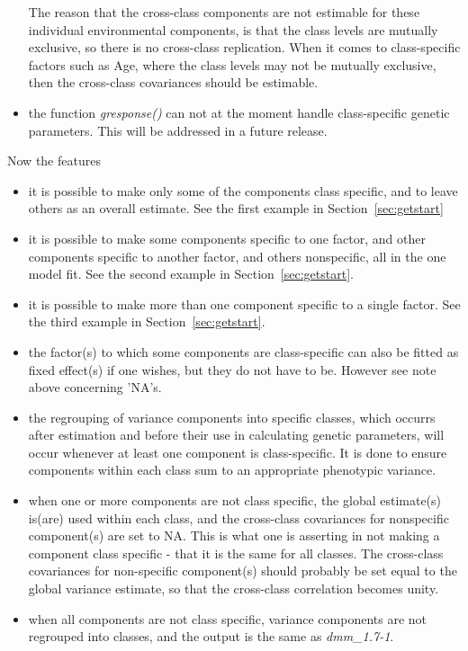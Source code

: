 \documentclass[titlepage]{article}  %
\begin{document}
\begin{itemize}
   The reason that the cross-class components are not estimable for these individual environmental components, is that the class levels are mutually exclusive, so there is no cross-class replication. When it comes to class-specific factors such as Age, where the class levels may not be mutually exclusive, then the cross-class covariances should be estimable. 
\item the function {\em gresponse()} can not at the moment handle class-specific genetic parameters. This will be addressed in a future release.
\end{itemize}
 
Now the features
\begin{itemize}
\item  it is possible to make only some of the components class specific, and to leave others as an overall estimate. See the first example in Section~\ref{sec:getstart}
\item  it is possible to make some components specific to one factor, and other components specific to another factor, and others nonspecific, all in the one model fit. See the second example in Section~\ref{sec:getstart}.
\item it is possible to make more than one component specific to a single factor. See the third example in Section~\ref{sec:getstart}.
\item  the factor(s) to which some components are class-specific can also be fitted as fixed effect(s) if one wishes, but they do not have to be. However see note above concerning 'NA's.
\item the regrouping of variance components into specific classes, which occurrs after estimation and before their use in calculating genetic parameters, will occur whenever at least one component is class-specific. It is done to ensure components within each class sum to an appropriate phenotypic variance. 
\item when one or more components are not class specific, the global estimate(s) is(are) used within each class, and the cross-class covariances for nonspecific component(s) are set to NA. This is what one is asserting in not making a component class specific - that it is the same for all classes. The cross-class covariances for non-specific component(s) should probably be set equal to the global variance estimate, so that the cross-class correlation becomes unity.
\item when all components are not class specific, variance components are not regrouped into classes, and the output is the same as {\em dmm\_1.7-1}.
\end{itemize}
\end{document}
